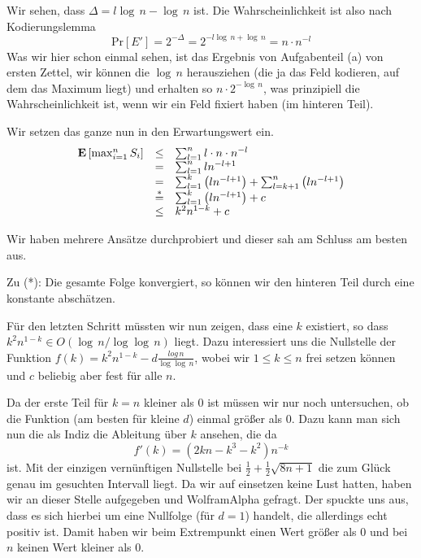 \documentclass[11pt,a4paper,ngerman]{article}
\newcommand{\erw}[1]{\text{\bfseries E} \left[ #1 \right]}
\newcommand{\prob}[1]{\text{Pr}\left[ #1 \right]}
\begin{document}
Wir sehen, dass $\Delta = l \log \, n - \log \, n$ ist. 
Die Wahrscheinlichkeit ist also nach Kodierungslemma
$$
   \prob{E'} = 2^{- \Delta} = 2^{- l \log \, n + \log \, n} = n \cdot n^{-l}
$$
Was wir hier schon einmal sehen, ist das Ergebnis von Aufgabenteil (a) von ersten Zettel, wir können die $\log \, n$ herausziehen (die ja das Feld kodieren, auf dem das Maximum liegt) und erhalten so $n \cdot 2^{- \log \, n}$, was prinzipiell die Wahrscheinlichkeit ist, wenn wir ein Feld fixiert haben (im hinteren Teil).

Wir setzen das ganze nun in den Erwartungswert ein.
$$\begin{array}{rcl}
   \erw{\max_{i=1}^n S_i} &\leq& \sum_{l=1}^n l \cdot n \cdot n^{-l}\\
                     &=& \sum_{l=1}^n l n^{-l+1}\\
                     &=& \sum_{l=1}^{k} \left(l n^{-l+1}\right) + \sum_{l=k + 1}^n \left(l n^{-l+1}\right)\\
                     &\stackrel{*}{=}& \sum_{l=1}^{k} \left(l n^{-l +1}\right) + c\\
                     &\leq& k^2 n^{1-k} + c
\end{array}$$

Wir haben mehrere Ansätze durchprobiert und dieser sah am Schluss am besten aus. 

Zu (*): Die gesamte Folge konvergiert, so können wir den hinteren Teil durch eine
konstante abschätzen.

Für den letzten Schritt müssten wir nun zeigen, dass eine $k$ existiert,
so dass $k^2 n^{1-k} \in O(\log \, n / \log \log \, n)$ liegt. Dazu interessiert
uns die Nullstelle der Funktion 
$f(k) = k^2 n^{1-k} - d \frac{log \, n}{\log \log \, n}$, wobei wir $1\leq k \leq n$
frei setzen können und $c$ beliebig aber fest für alle $n$.

Da der erste Teil für $k=n$ kleiner als $0$ ist müssen wir nur noch untersuchen, ob die Funktion (am besten für kleine $d$) einmal größer als $0$. Dazu kann man sich nun die als Indiz die Ableitung über $k$ ansehen, die da
$$
f'(k) = \left( 2kn - k^3 - k^2 \right) n^{-k}
$$
ist. Mit der einzigen vernünftigen Nullstelle bei $\frac{1}{2} + \frac{1}{2}\sqrt{8n+1}$ die zum Glück genau im gesuchten Intervall liegt. Da wir auf einsetzen keine Lust hatten, haben wir an dieser Stelle aufgegeben und WolframAlpha gefragt. Der spuckte uns aus, dass es sich hierbei um eine Nullfolge (für $d=1$) handelt, die allerdings echt positiv ist. Damit haben wir beim Extrempunkt einen Wert größer als $0$ und bei $n$ keinen Wert kleiner als $0$.
\end{document}
